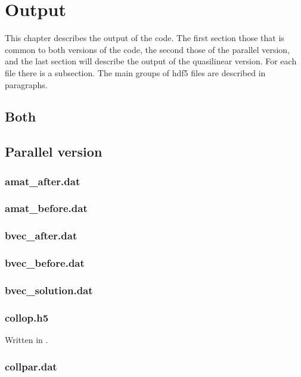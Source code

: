 \chapter{Output}
This chapter describes the output of the code.
The first section those that is common to both versions of the code, the
second those of the parallel version, and the last section will describe
the output of the quasilinear version.
For each file there is a subsection. The main groups of hdf5 files are
described in paragraphs.

\section{Both}

\section{Parallel version}

\subsection{amat\_after.dat}
\subsection{amat\_before.dat}

\subsection{bvec\_after.dat}
\subsection{bvec\_before.dat}
\subsection{bvec\_solution.dat}
\subsection{collop.h5}
Written in .

\subsection{collpar.dat}


